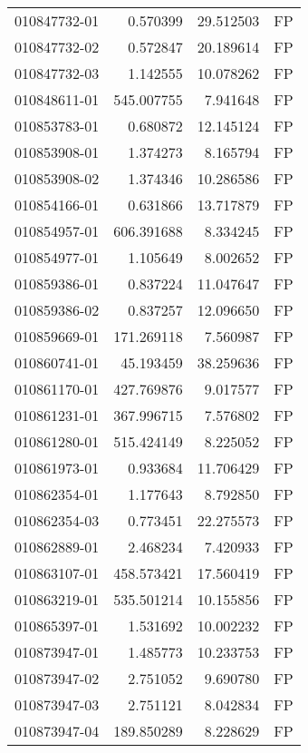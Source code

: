 \begin{tabular}{lrrl}
010847732-01 &    0.570399 &      29.512503 &   FP \\
010847732-02 &    0.572847 &      20.189614 &   FP \\
010847732-03 &    1.142555 &      10.078262 &   FP \\
010848611-01 &  545.007755 &       7.941648 &   FP \\
010853783-01 &    0.680872 &      12.145124 &   FP \\
010853908-01 &    1.374273 &       8.165794 &   FP \\
010853908-02 &    1.374346 &      10.286586 &   FP \\
010854166-01 &    0.631866 &      13.717879 &   FP \\
010854957-01 &  606.391688 &       8.334245 &   FP \\
010854977-01 &    1.105649 &       8.002652 &   FP \\
010859386-01 &    0.837224 &      11.047647 &   FP \\
010859386-02 &    0.837257 &      12.096650 &   FP \\
010859669-01 &  171.269118 &       7.560987 &   FP \\
010860741-01 &   45.193459 &      38.259636 &   FP \\
010861170-01 &  427.769876 &       9.017577 &   FP \\
010861231-01 &  367.996715 &       7.576802 &   FP \\
010861280-01 &  515.424149 &       8.225052 &   FP \\
010861973-01 &    0.933684 &      11.706429 &   FP \\
010862354-01 &    1.177643 &       8.792850 &   FP \\
010862354-03 &    0.773451 &      22.275573 &   FP \\
010862889-01 &    2.468234 &       7.420933 &   FP \\
010863107-01 &  458.573421 &      17.560419 &   FP \\
010863219-01 &  535.501214 &      10.155856 &   FP \\
010865397-01 &    1.531692 &      10.002232 &   FP \\
010873947-01 &    1.485773 &      10.233753 &   FP \\
010873947-02 &    2.751052 &       9.690780 &   FP \\
010873947-03 &    2.751121 &       8.042834 &   FP \\
010873947-04 &  189.850289 &       8.228629 &   FP \\

\end{tabular}

